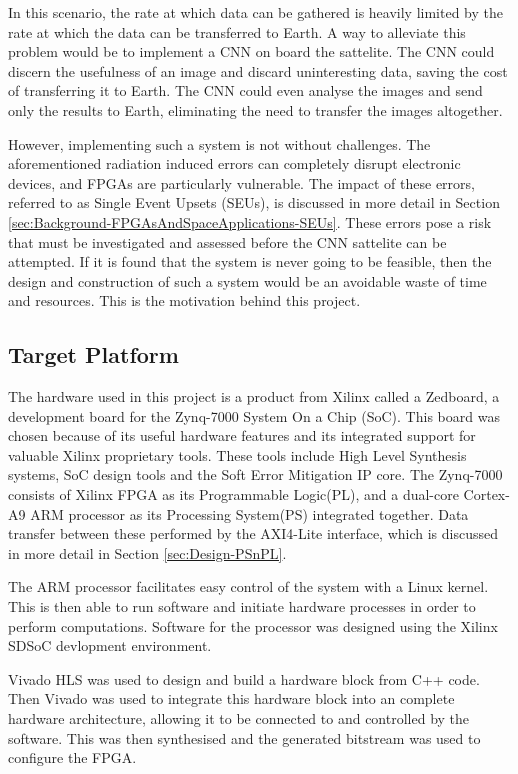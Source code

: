 \documentclass[12pt]{article}
\begin{document}
In this scenario, the rate at which data can be gathered is heavily limited by the rate at which the data can be transferred to Earth. A way to alleviate this problem would be to implement a CNN on board the sattelite. The CNN could discern the usefulness of an image and discard uninteresting data, saving the cost of transferring it to Earth. The CNN could even analyse the images and send only the results to Earth, eliminating the need to transfer the images altogether. 

However, implementing such a system is not without challenges. The aforementioned radiation induced errors can completely disrupt electronic devices, and FPGAs are particularly vulnerable. The impact of these errors, referred to as Single Event Upsets (SEUs), is discussed in more detail in Section \ref{sec:Background-FPGAsAndSpaceApplications-SEUs}. These errors pose a risk that must be investigated and assessed before the CNN sattelite can be attempted. If it is found that the system is never going to be feasible, then the design and construction of such a system would be an avoidable waste of time and resources. This is the motivation behind this project.

\subsection{Target Platform}
\label{sec:Background-TargetPlatform}


The hardware used in this project is a product from Xilinx called a Zedboard, a development board for the Zynq-7000 System On a Chip (SoC). This board was chosen because of its useful hardware features and its integrated support for valuable Xilinx proprietary tools. These tools include High Level Synthesis systems, SoC design tools and the Soft Error Mitigation IP core. The Zynq-7000 consists of Xilinx FPGA as its Programmable Logic(PL), and a dual-core Cortex-A9 ARM processor as its Processing System(PS) integrated together. Data transfer between these performed by the AXI4-Lite interface, which is discussed in more detail in Section \ref{sec:Design-PSnPL}.

The ARM processor facilitates easy control of the system with a Linux kernel. This is then able to run software and initiate hardware processes in order to perform computations. Software for the processor was designed using the Xilinx SDSoC devlopment environment.

Vivado HLS was used to design and build a hardware block from C++ code. Then Vivado was used to integrate this hardware block into an complete hardware architecture, allowing it to be connected to and controlled by the software. This was then synthesised and the generated bitstream was used to configure the FPGA.
\end{document}
